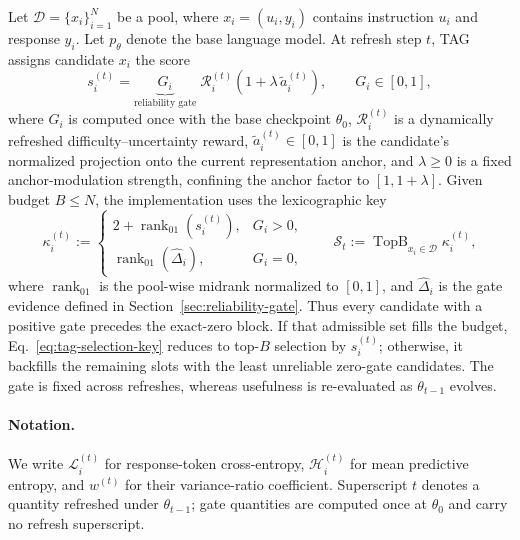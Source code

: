 Let \(\mathcal D=\{x_i\}_{i=1}^N\) be a pool, where
\(x_i=(u_i,y_i)\) contains instruction \(u_i\) and response \(y_i\). Let
\(p_{\theta}\) denote the base language model. At refresh step \(t\),
\textsc{TAG} assigns candidate \(x_i\) the score
\begin{equation}
  s_i^{(t)}
  =
  \underbrace{G_i}_{\text{reliability gate}}
  \;\mathcal R_i^{(t)}
  \left(1+\lambda\,
  \widetilde a_i^{(t)}\right),
  \qquad G_i\in[0,1],
  \label{eq:tag-score-method}
\end{equation}
where \(G_i\) is computed once with the base checkpoint \(\theta_0\),
\(\mathcal R_i^{(t)}\) is a dynamically refreshed
difficulty--uncertainty reward,
\(\widetilde a_i^{(t)}\in[0,1]\) is the candidate's normalized
projection onto the current representation anchor, and
\(\lambda\ge 0\) is a fixed anchor-modulation strength, confining the
anchor factor to \([1,1+\lambda]\). Given budget \(B\le N\),
the implementation uses the lexicographic key
\begin{equation}
  \kappa_i^{(t)}
  :=
  \begin{cases}
    2+\operatorname{rank}_{01}\!\left(s_i^{(t)}\right), & G_i>0,\\
    \operatorname{rank}_{01}\!\left(\widehat{\Delta}_i\right), & G_i=0,
  \end{cases}
  \qquad
  \mathcal S_t
  :=\operatorname{TopB}_{x_i\in\mathcal D}\kappa_i^{(t)},
  \label{eq:tag-selection-key}
\end{equation}
where \(\operatorname{rank}_{01}\) is the pool-wise midrank normalized
to \([0,1]\), and \(\widehat{\Delta}_i\) is the gate evidence defined
in Section~\ref{sec:reliability-gate}. Thus every candidate with a
positive gate precedes the exact-zero block. If that admissible set
fills the budget, Eq.~\eqref{eq:tag-selection-key} reduces to top-\(B\)
selection by \(s_i^{(t)}\); otherwise, it backfills the remaining slots
with the least unreliable zero-gate candidates. The gate is fixed
across refreshes, whereas usefulness is re-evaluated as
\(\theta_{t-1}\) evolves.
\paragraph{Notation.}
We write \(\mathcal L_i^{(t)}\) for response-token cross-entropy,
\(\mathcal H_i^{(t)}\) for mean predictive entropy, and
\(w^{(t)}\) for their variance-ratio coefficient. Superscript \(t\)
denotes a quantity refreshed under \(\theta_{t-1}\); gate quantities
are computed once at \(\theta_0\) and carry no refresh superscript.


